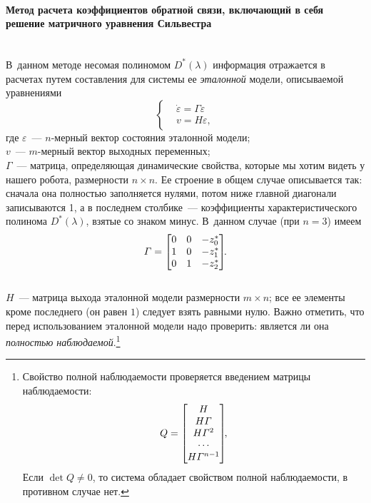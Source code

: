 \documentclass[12pt,a4paper,openany]{extarticle}
\begin{document}
\paragraph*{Метод расчета коэффициентов обратной связи, включающий в себя решение матричного уравнения Сильвестра}$\phantom{-}$ \\
\hspace*{\parindent}В~данном методе несомая полиномом $D^*(\lambda)$ информация отражается в расчетах путем составления для системы ее \textit{эталонной} модели, описываемой уравнениями
\begin{equation}\label{etalon}
	\left\{
	\begin{aligned}
		&\!\dot{\varepsilon} = \varGamma\varepsilon \\	
		&\!v = H\varepsilon,	
	\end{aligned}
	\right.
\end{equation}
где
$\varepsilon$~--- $n$-мерный вектор состояния эталонной модели;\\
$v$~--- $m$-мерный вектор выходных переменных;\\
$\varGamma$~--- матрица, определяющая динамические свойства, которые мы хотим видеть у нашего робота, размерности $n \times n$. Ее строение в общем случае описывается так: сначала она полностью заполняется нулями, потом ниже главной диагонали записываются 1, а в последнем столбике~--- коэффициенты характеристического полинома $D^*(\lambda)$, взятые со знаком минус.
В~данном случае (при $n = 3$) имеем
\begin{equation}
	\varGamma =
	\begin{bmatrix}
		0 & 0 & -z^*_0 \\
		1 & 0 & -z^*_1 \\
		0 & 1 & -z^*_2
	\end{bmatrix}\!\!\ldotp
\end{equation}\\
$H$~--- матрица выхода эталонной модели размерности $m \times n$; все ее элементы кроме последнего (он равен $1$) следует взять равными нулю.  
Важно отметить, что перед использованием эталонной модели надо проверить: является ли она \textit{полностью наблюдаемой}\lefteqn.\footnote{Свойство полной наблюдаемости проверяется введением матрицы наблюдаемости:
\begin{equation}\notag
	Q = 
	\begin{bmatrix}
		 H \\
		 H\varGamma \\
		 H\varGamma^2 \\
		 \cdots \\
		 H\varGamma^{n-1}
	\end{bmatrix}\!\!,
\end{equation}
Если $\det Q \ne 0$, то система обладает свойством полной наблюдаемости, в противном случае нет.}  
\end{document}
